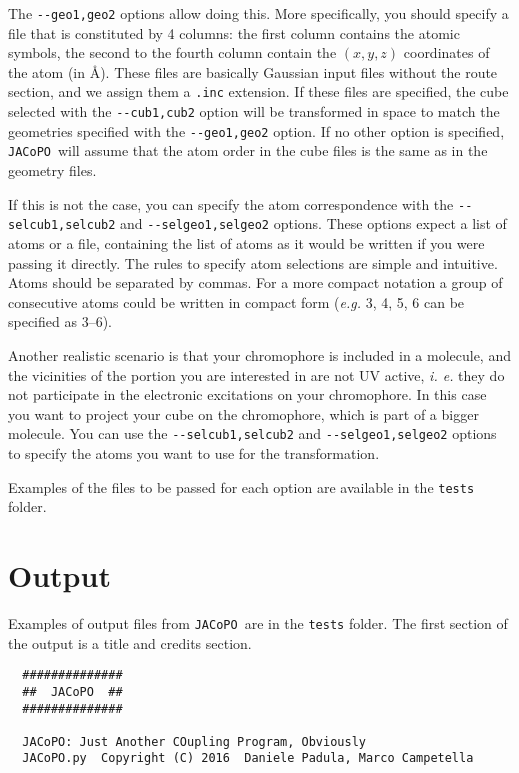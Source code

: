 \documentclass[a4paper]{article}
\newcommand{\jacopo}{\texttt{JACoPO}}
\begin{document}
The \verb|--geo1,geo2| options allow doing this. More specifically, you should specify a file that is constituted by 4 columns: the first column contains the atomic symbols, the second to the fourth column contain the $(x, y, z)$ coordinates of the atom (in \AA{}). These files are basically Gaussian input files without the route section, and we assign them a \verb|.inc| extension. If these files are specified, the cube selected with the \verb|--cub1,cub2| option will be transformed in space to match the geometries specified with the \verb|--geo1,geo2| option. If no other option is specified, \jacopo\ will assume that the atom order in the cube files is the same as in the geometry files.

If this is not the case, you can specify the atom correspondence with the \verb|--selcub1,selcub2| and \verb|--selgeo1,selgeo2| options. These options expect a list of atoms or a file, containing the list of atoms as it would be written if you were passing it directly. The rules to specify atom selections are simple and intuitive. Atoms should be separated by commas. For a more compact notation a group of consecutive atoms could be written in compact form (\textit{e.g.} 3, 4, 5, 6 can be specified as 3--6).

Another realistic scenario is that your chromophore is included in a molecule, and the vicinities of the portion you are interested in are not UV active, \textit{i. e.} they do not participate in the electronic excitations on your chromophore. In this case you want to project your cube on the chromophore, which is part of a bigger molecule. You can use the \verb|--selcub1,selcub2| and \verb|--selgeo1,selgeo2| options to specify the atoms you want to use for the transformation.

Examples of the files to be passed for each option are available in the \verb|tests| folder.

\section{Output}
Examples of output files from \jacopo\ are in the \verb|tests| folder. The first section of the output is a title and credits section.

\begin{verbatim}
  ##############
  ##  JACoPO  ##
  ##############
  
  JACoPO: Just Another COupling Program, Obviously
  JACoPO.py  Copyright (C) 2016  Daniele Padula, Marco Campetella
\end{verbatim}
\end{document}
